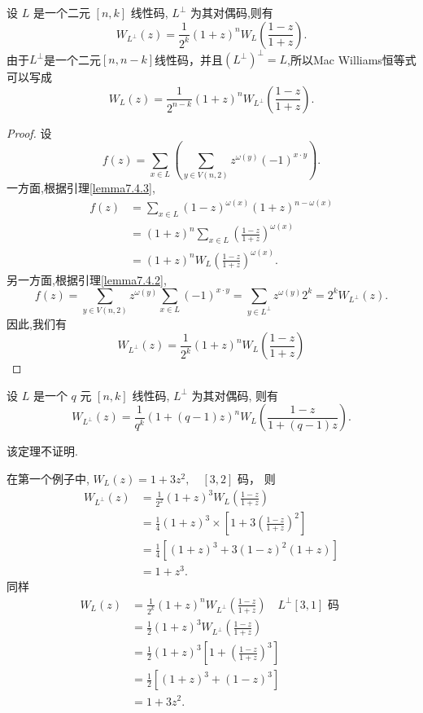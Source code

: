 \begin{theorem}
    设 $ L $ 是一个二元 $ [n, k] $ 线性码, $ L^{\perp} $ 为其对偶码,则有
$$
W_{L^{\perp}}(z)=\frac{1}{2^{k}}(1+z)^{n} W_{L}\left(\frac{1-z}{1+z}\right) .
$$
由于$L^\perp$是一个二元$[n,n-k]$线性码，并且$(L^\perp)^\perp=L$,所以Mac Williams恒等式可以写成
$$
W_{L}(z)=\frac{1}{2^{n-k}}(1+z)^{n} W_{L^{\perp}}\left(\frac{1-z}{1+z}\right) .
$$
\end{theorem}
\begin{proof}
 设
$$
f(z)=\sum_{x \in L}\left(\sum_{y \in V(n, 2)} z^{\omega(y)}(-1)^{x \cdot y}\right) .
$$
一方面,根据引理\ref{lemma7.4.3},
$$
\begin{aligned}
f(z)&=\sum_{x \in L}(1-z)^{\omega(x)}(1+z)^{n-\omega(x)}\\
&=(1+z)^{n} \sum_{x \in L}\left(\frac{1-z}{1+z}\right)^{\omega(x)} \\
&=(1+z)^{n} W_{L}\left(\frac{1-z}{1+z}\right)^{\omega(x)} .
\end{aligned}
$$
另一方面,根据引理\ref{lemma7.4.2},
$$
f(z)=\sum_{y \in V(n, 2)} z^{\omega(y)} \sum_{x \in L}(-1)^{x \cdot y}=\sum_{y \in L^{\perp}} z^{\omega(y)} 2^{k}=2^{k} W_{L^{\perp}}(z) .
$$
因此,我们有
$$
W_{L^{\perp}}(z)=\frac{1}{2^{k}}(1+z)^{n} W_{L}\left(\frac{1-z}{1+z}\right)
$$
\end{proof}

\begin{theorem}
设 $ L $ 是一个 $ q $ 元 $ [n, k] $ 线性码, $ L^{\perp} $ 为其对偶码, 则有
$$
W_{L^{\perp}}(z)=\frac{1}{q^{k}}(1+(q-1) z)^{n} W_{L}\left(\frac{1-z}{1+(q-1) z}\right) .
$$
\end{theorem}
该定理不证明.

\begin{example}
    在第一个例子中, $ W_{L}(z)=1+3 z^{2}, \quad[3,2] $ 码， 则 
$$
\begin{aligned}
W_{L^{\perp}}(z) & =\frac{1}{2^{2}}(1+z)^{3} W_{L}\left(\frac{1-z}{1+z}\right) \\
& =\frac{1}{4}(1+z)^{3} \times\left[1+3\left(\frac{1-z}{1+z}\right)^{2}\right] \\
& =\frac{1}{4}\left[(1+z)^{3}+3(1-z)^{2}(1+z)\right] \\
& =1+z^{3} .
\end{aligned}
$$
同样 $$ \begin{aligned} W_{L}(z) & =\frac{1}{2^{k}}(1+z)^{n} W_{L^{\perp}}\left(\frac{1-z}{1+z}\right) \quad L^{\perp}[3,1] \text { 码 } \\ & =\frac{1}{2}(1+z)^{3} W_{L^{\perp}}\left(\frac{1-z}{1+z}\right) \\ & =\frac{1}{2}(1+z)^{3}\left[1+\left(\frac{1-z}{1+z}\right)^{3}\right] \\ & =\frac{1}{2}\left[(1+z)^{3}+(1-z)^{3}\right] \\ & =1+3 z^{2} .\end{aligned} $$
\end{example}